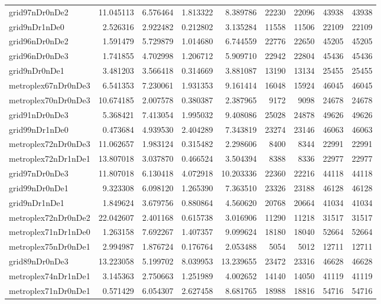 \begin{longtable}{|l|r|r|r|r|r|r|r|r|}
grid97nDr0nDe2 & 11.045113 & 6.576464 & 1.813322 & 8.389786 & 22230 & 22096 & 43938 & 43938 \\
grid9nDr1nDe0 & 2.526316 & 2.922482 & 0.212802 & 3.135284 & 11558 & 11506 & 22109 & 22109 \\
grid96nDr0nDe2 & 1.591479 & 5.729879 & 1.014680 & 6.744559 & 22776 & 22650 & 45205 & 45205 \\
grid96nDr0nDe3 & 1.741855 & 4.702998 & 1.206712 & 5.909710 & 22942 & 22804 & 45436 & 45436 \\
grid9nDr0nDe1 & 3.481203 & 3.566418 & 0.314669 & 3.881087 & 13190 & 13134 & 25455 & 25455 \\
metroplex67nDr0nDe3 & 6.541353 & 7.230061 & 1.931353 & 9.161414 & 16048 & 15924 & 46045 & 46045 \\
metroplex70nDr0nDe3 & 10.674185 & 2.007578 & 0.380387 & 2.387965 & 9172 & 9098 & 24678 & 24678 \\
grid91nDr0nDe3 & 5.368421 & 7.413054 & 1.995032 & 9.408086 & 25028 & 24878 & 49626 & 49626 \\
grid99nDr1nDe0 & 0.473684 & 4.939530 & 2.404289 & 7.343819 & 23274 & 23146 & 46063 & 46063 \\
metroplex72nDr0nDe3 & 11.062657 & 1.983124 & 0.315482 & 2.298606 & 8400 & 8344 & 22991 & 22991 \\
metroplex72nDr1nDe1 & 13.807018 & 3.037870 & 0.466524 & 3.504394 & 8388 & 8336 & 22977 & 22977 \\
grid97nDr0nDe3 & 11.807018 & 6.130418 & 4.072918 & 10.203336 & 22360 & 22216 & 44118 & 44118 \\
grid99nDr0nDe1 & 9.323308 & 6.098120 & 1.265390 & 7.363510 & 23326 & 23188 & 46128 & 46128 \\
grid9nDr1nDe1 & 1.849624 & 3.679756 & 0.880864 & 4.560620 & 20768 & 20664 & 41034 & 41034 \\
metroplex72nDr0nDe2 & 22.042607 & 2.401168 & 0.615738 & 3.016906 & 11290 & 11218 & 31517 & 31517 \\
metroplex71nDr1nDe0 & 1.263158 & 7.692267 & 1.407357 & 9.099624 & 18180 & 18040 & 52664 & 52664 \\
metroplex75nDr0nDe1 & 2.994987 & 1.876724 & 0.176764 & 2.053488 & 5054 & 5012 & 12711 & 12711 \\
grid89nDr0nDe3 & 13.223058 & 5.199702 & 8.039953 & 13.239655 & 23472 & 23316 & 46628 & 46628 \\
metroplex74nDr1nDe1 & 3.145363 & 2.750663 & 1.251989 & 4.002652 & 14140 & 14050 & 41119 & 41119 \\
metroplex71nDr0nDe1 & 0.571429 & 6.054307 & 2.627458 & 8.681765 & 18988 & 18816 & 54716 & 54716 \\

\end{longtable}
